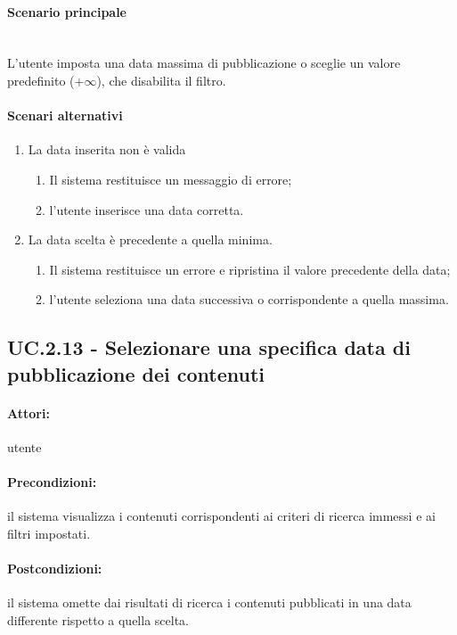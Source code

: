\documentclass[10pt,a4paper,headinclude,footinclude,hidelinks]{scrreprt} %
\begin{document}
	\paragraph{Scenario principale} \hfill \\
	L'utente imposta una data massima di pubblicazione o sceglie un valore predefinito ($+\infty$), che disabilita il filtro.
	\paragraph{Scenari alternativi}
	\begin{enumerate}
	\item La data inserita non è valida
		\begin{enumerate}
		\item Il sistema restituisce un messaggio di errore;
		\item l'utente inserisce una data corretta.
		\end{enumerate}
	\item La data scelta è precedente a quella minima.
		\begin{enumerate}
		\item Il sistema restituisce un errore e ripristina il valore precedente della data;
		\item l'utente seleziona una data successiva o corrispondente a quella massima.
		\end{enumerate}
	\end{enumerate}

	\subsection[UC.2.13]{UC.2.13 - Selezionare una specifica data di pubblicazione dei contenuti}
	\label{sec:stage:ar:uc:2_13}
	\paragraph{Attori:} utente
	\paragraph{Precondizioni:} il sistema visualizza i contenuti corrispondenti ai criteri di ricerca immessi e ai filtri impostati.
	\paragraph{Postcondizioni:} il sistema omette dai risultati di ricerca i contenuti pubblicati in una data differente rispetto a quella scelta.
\end{document}
